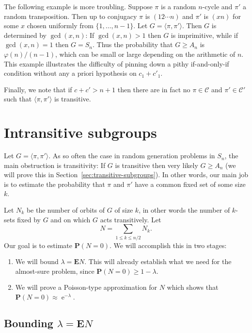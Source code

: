 \documentclass[ALCO,ThmDefs,Unicode,epreuves]{cedram}
\DeclareMathOperator{\expe}{e}
\newcommand\calC{\mathcal{C}}
\renewcommand\P{\mathbf{P}}
\newcommand\E{\mathbf{E}}
\begin{document}
The following example is more troubling. Suppose $\pi$ is a random $n$-cycle and $\pi'$ a random transposition. Then up to conjugacy $\pi$ is $(1 2 \cdots n)$ and $\pi'$ is $(x n)$ for some $x$ chosen uniformly from $\{1, \dots, n-1\}$. Let $G = \langle \pi, \pi'\rangle$. Then $G$ is determined by $\gcd(x, n)$: If $\gcd(x, n)>1$ then $G$ is imprimitive, while if $\gcd(x, n)=1$ then $G = S_n$. Thus the probability that $G \geq A_n$ is $\varphi(n) / (n-1)$, which can be small or large depending on the arithmetic of $n$. This example illustrates the difficulty of pinning down a pithy if-and-only-if condition without any a priori hypothesis on $c_1 + c'_1$.

Finally, we note that if $c + c' > n + 1$ then there are in fact no $\pi \in \calC$ and $\pi'\in\calC'$ such that $\langle \pi, \pi'\rangle$ is transitive.

\section{Intransitive subgroups} \label{sec:intransitive}

Let $G = \langle \pi, \pi'\rangle$. As so often the case in random generation problems in $S_n$, the main obstruction is transitivity: If $G$ is transitive then very likely $G \geq A_n$ (we will prove this in Section~\ref{sec:transitive-subgroups}). In other words, our main job is to estimate the probability that $\pi$ and $\pi'$ have a common fixed set of some size $k$.

Let $N_k$ be the number of orbits of $G$ of size $k$, in other words the number of $k$-sets fixed by $G$ and on which $G$ acts transitively. Let
\[
 N = \sum_{1\leq k \leq n/2} N_k.
\]
Our goal is to estimate $\P(N = 0)$. We will accomplish this in two stages:
\begin{enumerate}
 \item\label{sect2.5_1} We will bound $\lambda = \E N$. This will already establish what we need for the almost-sure problem, since $\P(N = 0) \geq 1 - \lambda$.
 \item\label{sect2.5_2} We will prove a Poisson-type approximation for $N$ which shows that $\P(N=0) \approx \expe^{-\lambda}$.
\end{enumerate}

\subsection{Bounding \texorpdfstring{$\lambda = \E N$}{lambda = EN}}
\end{document}
